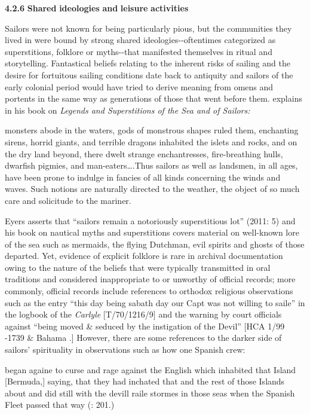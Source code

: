 \textbf{4.2.6} \textbf{Shared} \textbf{ideologies} \textbf{and} \textbf{leisure} \textbf{activities}

  Sailors were not known for being particularly pious, but the communities they lived in were bound by strong shared ideologies-{}-oftentimes categorized as superstitions, folklore or myths-{}-that manifested themselves in ritual and storytelling. Fantastical beliefs relating to the inherent risks of sailing and the desire for fortuitous sailing conditions date back to antiquity and sailors of the early colonial period would have tried to derive meaning from omens and portents in the same way as generations of those that went before them. \citet{Bassett1885} explains in his book on \textit{Legends and Superstitions of the Sea and of Sailors:}

monsters abode in the waters, gods of monstrous shapes ruled them, enchanting sirens, horrid giants, and terrible dragons inhabited the islets and rocks, and on the dry land beyond, there dwelt strange enchantresses, fire-breathing hulls, dwarfish pigmies, and man-eaters….Thus sailors as well as landsmen, in all ages, have been prone to indulge in fancies of all kinds concerning the winds and waves. Such notions are naturally directed to the weather, the object of so much care and solicitude to the mariner. \citep[12]{Bassett1885}

Eyers asserts that “sailors remain a notoriously superstitious lot” (2011: 5) and his book on nautical myths and superstitions covers material on well-known lore of the sea such as mermaids, the flying Dutchman, evil spirits and ghosts of those departed. Yet, evidence of explicit folklore is rare in archival documentation owing to the nature of the beliefs that were typically transmitted in oral traditions and considered inappropriate to or unworthy of official records; more commonly, official records include references to orthodox religious observations such as the entry “this day being sabath day our Capt was not willing to saile” in the logbook of the \textit{Carlyle} [T/70/1216/9] and the warning by court officials against “being moved \& seduced by the instigation of the Devil” [HCA 1/99 \citealt{Jamaica1738}-1739 \& Bahama \citealt{Islands1722}.] However, there are some references to the darker side of sailors’ spirituality in observations such as how one Spanish crew: 

began againe to curse and rage against the English which inhabited that Island [Bermuda,] saying, that they had inchated that and the rest of those Islands about and did still with the devill raile stormes in those seas when the Spanish Fleet passed that way (\citealt{Gage1648}: 201.) 

